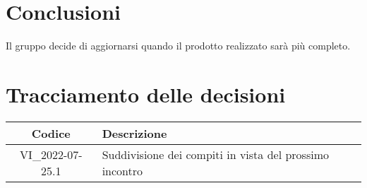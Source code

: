 \section{Conclusioni}
Il gruppo decide di aggiornarsi quando il prodotto realizzato sarà più completo. 
\newpage

\section*{Tracciamento delle decisioni}
	\renewcommand{\arraystretch}{1.8} %
	\begin{tabular}{ |c|l| }
		\hline
		\textbf{Codice} & \textbf{Descrizione} \\
		\hline
		VI\_2022-07-25.1 & Suddivisione dei compiti in vista del prossimo incontro \\
		\hline
	\end{tabular}
